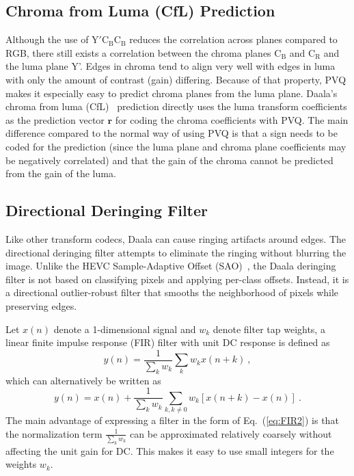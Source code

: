 \documentclass[english,conference,10pt]{IEEEtran}
\begin{document}
\subsection{Chroma from Luma (CfL) Prediction}

Although the use of $\mathrm{Y'C_BC_B}$ reduces the correlation across planes
compared to RGB, there still exists a correlation between the chroma planes
$\mathrm{C_B}$ and $\mathrm{C_R}$ and the luma plane Y'. Edges in chroma tend to
align very well with edges in luma with only the amount of contrast (gain) differing.
Because of that property, PVQ makes it especially easy to predict
chroma planes from the luma plane. Daala's chroma from luma (CfL)~\cite{egge2015spie}
prediction directly uses the luma transform coefficients as the prediction vector
$\mathbf{r}$ for coding the chroma coefficients with PVQ. The main difference compared
to the normal way of using PVQ is that a sign needs to be coded for the prediction
(since the luma plane and chroma plane coefficients may be negatively correlated) and
that the gain of the chroma cannot be predicted from the gain of the luma.


\subsection{Directional Deringing Filter}

Like other transform codecs, Daala can cause ringing artifacts around edges.
The directional deringing filter attempts to eliminate the ringing without
blurring the image. Unlike the HEVC Sample-Adaptive Offset (SAO)~\cite{HEVC-SAO},
the Daala deringing filter is not based on classifying pixels and applying per-class
offsets. Instead, it is a directional outlier-robust filter that smooths the
neighborhood of pixels while preserving edges.

Let $x\left(n\right)$ denote a 1-dimensional signal and $w_{k}$
denote filter tap weights, a linear finite impulse response (FIR)
filter with unit DC response is defined as
\begin{equation}
y\left(n\right)=\frac{1}{\sum_{k}w_{k}}\sum_{k}w_{k}x\left(n+k\right)\ ,\label{eq:FIR1}
\end{equation}
which can alternatively be written as
\begin{equation}
y\left(n\right)=x\left(n\right)+\frac{1}{\sum_{k}w_{k}}\sum_{k,k\neq0}w_{k}\left[x\left(n+k\right)-x\left(n\right)\right]\ .\label{eq:FIR2}
\end{equation}
The main advantage of expressing a filter in the form of Eq.~(\ref{eq:FIR2})
is that the normalization term $\frac{1}{\sum_{k}w_{k}}$ can be approximated
relatively coarsely without affecting the unit gain for DC. This makes
it easy to use small integers for the weights $w_{k}$.
\end{document}

